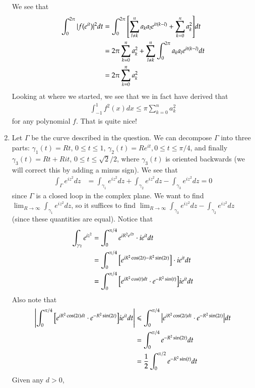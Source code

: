 \documentclass[12pt]{article}
\theoremstyle{definition}
\theoremstyle{remark}
\renewcommand{\leq}{\leqslant}
\begin{document}
\begin{enumerate}[leftmargin=\labelsep]
		We see that
		\begin{align*}
			\int_0^{2\pi} |f(e^{it})|^2dt &= \int_0^{2\pi} \qty[\sum_{l \neq k}^n a_ka_le^{it(k-l)} + \sum_{k=0}^n a_k^2]dt \\
			&= 2\pi \sum_{k=0}^n a_k^2 + \sum_{l \neq k}^n \int_0^{2\pi} a_ka_le^{it(k-l)}dt \\
			&= 2\pi \sum_{k=0}^n a_k^2
		\end{align*}
		Looking at where we started, we see that we in fact have derived that
		\begin{align*}
			\int_{-1}^1 f^2(x)dx \leq \pi \sum_{k=0}^n a_k^2
		\end{align*}
		for any polynomial $f$. That is quite nice!
		
		\item Let $\Gamma$ be the curve described in the question. We can decompose $\Gamma$ into three parts: $\gamma_1(t) = Rt$, $0 \leq t \leq 1$, $\gamma_2(t) = Re^{it}, 0 \leq t \leq \pi/4$, and finally $\gamma_3(t) = Rt + Rit$, $0 \leq t \leq \sqrt{2}/2$, where $\gamma_3(t)$ is oriented backwards (we will correct this by adding a minus sign). We see that
		\begin{align*}
			\int_\Gamma e^{iz^2}dz &= \int_{\gamma_1} e^{iz^2}dz + \int_{\gamma_2} e^{iz^2}dz - \int_{\gamma_3} e^{iz^2}dz = 0
		\end{align*}
		since $\Gamma$ is a closed loop in the complex plane. We want to find $\lim_{R\to \infty} \int_{\gamma_1} e^{iz^2}dz$, so it suffices to find $\lim_{R\to \infty}\int_{\gamma_3} e^{iz^2}dz - \int_{\gamma_2} e^{iz^2}dz$ (since these quantities are equal). Notice that
		\begin{align*}
			\int_{\gamma_2} e^{iz^2} &= \int_0^{\pi/4} e^{iR^2e^{i2t}} \cdot ie^{it}dt \\
			&= \int_0^{\pi/4} \qty[e^{iR^2\cos(2t)-R^2\sin(2t)}] \cdot ie^{it}dt \\
			&= \int_0^{\pi/4} \qty[e^{iR^2\cos(t)dt} \cdot e^{-R^2\sin(t)}]ie^{it}dt \\
		\end{align*}
		Also note that
		\begin{align*}
			\qty|\int_0^{\pi/4} \qty[e^{iR^2\cos(2t)dt} \cdot e^{-R^2\sin(2t)}]ie^{it}dt| &\leq \int_0^{\pi/4} \qty|e^{iR^2\cos(2t)dt} \cdot e^{-R^2\sin(2t)}|dt \\
			&= \int_0^{\pi/4} e^{-R^2\sin(2t)}dt \\
			&= \frac12 \int_0^{\pi/2} e^{-R^2\sin(t)}dt
		\end{align*}
		Given any $d > 0$,  

\end{enumerate}
\end{document}
